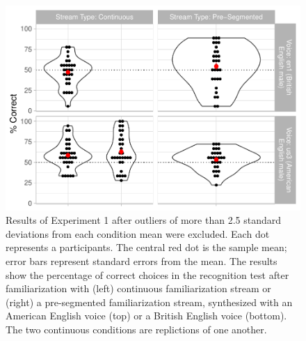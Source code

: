\documentclass[
]{article}
\begin{document}
\begin{figure}

{\centering \includegraphics[width=0.8\linewidth]{segmentation_recall_combined_for_revision_files/figure-latex/stats-london-stats.3x.us.en.segm.cont.combined.plot-no-outliers-1} 

}

\caption{Results of Experiment 1 after outliers of more than 2.5 standard deviations from each condition mean were excluded. Each dot represents a participants. The central red dot is the sample mean; error bars represent standard errors from the mean. The results show the percentage of correct choices in the recognition test after familiarization with (left) continuous familiarization stream or (right) a pre-segmented familiarization stream, synthesized with an American English voice (top) or a British English voice (bottom). The two continuous conditions are replictions of one another.}\label{fig:stats-london-stats.3x.us.en.segm.cont.combined.plot-no-outliers}
\end{figure}
\end{document}
